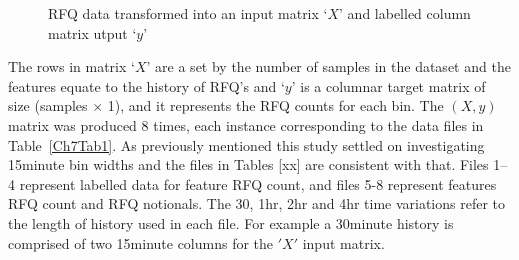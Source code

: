 \begin{figure}[!ht]\centering
    \caption{RFQ data transformed into an input matrix `$X$' and labelled column matrix utput `$y$' }\label{Ch7Fig:2}
\end{figure}

The rows in matrix `$X$' are a set by the number of samples in the dataset and the features equate to the history of RFQ's and `$y$' is a columnar target matrix of size (samples $\times$ 1), and it represents the RFQ counts for each bin. The $(X,y)$ matrix was produced 8 times, each instance corresponding to the data files in Table~\ref{Ch7Tab1}. As previously mentioned this study settled on investigating 15minute bin widths and the files in Tables [xx] are consistent with that. Files 1--4 represent labelled data for feature RFQ count, and files 5-8 represent features RFQ count and RFQ notionals. The 30, 1hr, 2hr and 4hr time variations refer to the length of history used in each file. For example a 30minute history is comprised of two 15minute columns for the $'X'$ input matrix.

